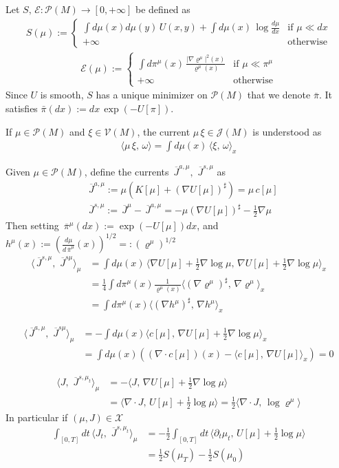 \documentclass[reqno]{amsart}
\numberwithin{equation}{section}
\numberwithin{theorem}{section}
\newcommand{\mc}[1]{{\mathcal #1}}
\newcommand{\upbar}[1]{\,\overline{\! #1}}
\newcommand{\bel}[2]{\begin{equation} \label{#1} \begin{split} #2
 \end{split} \end{equation}}
\newcommand{\dangle}[2]{\langle #1,\,#2 \rangle}
\newcommand{\comment}[1]{
\par\noindent
\colorbox{light}{\begin{minipage}{120 mm}#1\end{minipage}}
\par\noindent
}
\begin{document}
Let $S,\,\mc E\colon \mc P(M)\to [0,+\infty]$ be defined as
\bel{e:qp1}{
S(\mu):= 
\begin{cases}
 \int d\mu(x)d\mu(y)\, U(x,y)+\int d\mu(x)\,\log \tfrac{d\mu}{dx} & \text{if $\mu \ll dx$}
\\
 +\infty & \text{otherwise}
\end{cases}
}
\bel{e:qp2}{
\mc E(\mu):= 
\begin{cases}
 \int d\pi^\mu(x)\,\frac{|\nabla \varrho^\mu|^2(x)}{\varrho^\mu(x)}
  & \text{if $\mu \ll \pi^\mu$}
\\
 +\infty & \text{otherwise}
\end{cases}
}
Since $U$ is smooth, $S$ has a unique minimizer on $\mc P(M)$ that we denote $\bar \pi$. It satisfies $\bar \pi(dx):=dx\,\exp(-U[\pi])$.
\newpage


\comment{
If $\mu\in \mc P(M)$ and $\xi\in \mc V(M)$, the current $\mu\,\xi\in \mc J(M)$ is understood as
\bel{e:curvec}{
\dangle{\mu\,\xi}{\omega}=\int d\mu(x)\,\dangle{\xi}{\omega}_x
}

Given $\mu \in \mc P(M)$, define the currents $\upbar J^{a,\mu},\,\upbar J^{s,\mu}$ as
\bel{e:jmu}{
& \upbar J^{a,\mu}:=\mu \left(K[\mu]+(\nabla U[\mu])^\sharp\right)=\mu\,c[\mu]
\\
& \upbar J^{s,\mu}:= \upbar J^{\mu}-\upbar J^{a,\mu}=-\mu (\nabla U[\mu])^\sharp-\tfrac 12 \nabla \mu
}
Then setting $\upbar \pi^\mu(dx):=\exp(-U[\mu])dx$, and $h^\mu(x):=(\frac{d\mu}{d\upbar \pi^\mu}(x))^{1/2}=:(\varrho^\mu)^{1/2}$
\bel{e:scal1}{
\dangle{\upbar J^{s,\mu}}{\upbar J^{s\mu}}_\mu 
&=
\int d\mu(x)\,\dangle{\nabla U[\mu]+ \tfrac 12 \nabla \log \mu}{\nabla U[\mu]+\tfrac 12 \nabla \log \mu}_x
\\ & 
=\tfrac 14 \int d\pi^\mu(x) \frac{1}{\varrho^\mu(x)} \dangle{ (\nabla \varrho^\mu)^\sharp}{ \nabla\varrho^\mu}_x
\\ &
= \int d\pi^\mu(x)\dangle{ (\nabla h^\mu)^\sharp}{ \nabla h^\mu}_x
}

\bel{e:scal2}{
\dangle{\upbar J^{a,\mu}}{\upbar J^{s\mu}}_\mu& =-\int d\mu(x) \dangle{c[\mu]}{\nabla U[\mu]+\tfrac 12 \nabla \log \mu}_x
\\ &
=\int d\mu(x) \left( (\nabla \cdot c[\mu])(x)- \dangle{c[\mu]}{\nabla U[\mu]}_x\right)=0
}

\bel{e:scal3a}{
\dangle{J}{\upbar J^{s,\mu_t}}_\mu& =- \dangle{J}{\nabla U[\mu]+\tfrac 12 \nabla \log \mu}
\\
&=\dangle{ \nabla \cdot J}{ U[\mu]+\tfrac 12 \log \mu}=
\tfrac 12 \dangle{ \nabla \cdot J}{\log \varrho^\mu}
}
In particular if $(\mu,J)\in \mc X$
\bel{e:scal3b}{
\int_{[0,T]}dt\,\dangle{J_t}{\upbar J^{s,\mu_t}}_\mu
& =
-\tfrac 12 \int_{[0,T]}dt\,\dangle{ \partial_t \mu_t}{U[\mu]+\tfrac 12 \log \mu}
\\ & =
\tfrac 12 S(\mu_T)-\tfrac 12 S(\mu_0)}

}
\end{document}
